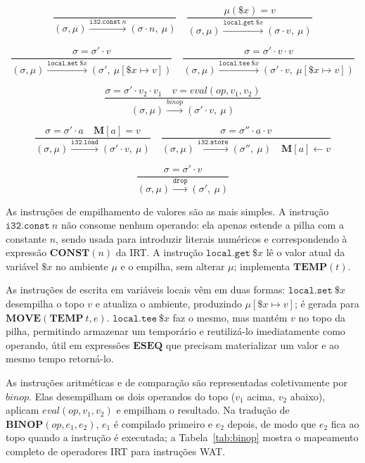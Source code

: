 \begin{Definition}\label{def:wat-instrs}
  \[
    \dfrac{}
    {(\sigma, \mu) \xrightarrow{\mathtt{i32.const}\ n} (\sigma \cdot n,\ \mu)}
    \quad
    \dfrac{\mu(\$x) = v}
    {(\sigma, \mu) \xrightarrow{\mathtt{local.get}\ \$x} (\sigma \cdot v,\ \mu)}
  \]

  \[
    \dfrac{\sigma = \sigma' \cdot v}
    {(\sigma, \mu) \xrightarrow{\mathtt{local.set}\ \$x}
    (\sigma',\ \mu[\$x \mapsto v])}
    \quad
    \dfrac{\sigma = \sigma' \cdot v \cdot v}
    {(\sigma, \mu) \xrightarrow{\mathtt{local.tee}\ \$x} (\sigma'
    \cdot v,\ \mu[\$x \mapsto v])}
  \]

  \[
    \dfrac{\sigma = \sigma' \cdot v_2 \cdot v_1 \quad v =
    \mathit{eval}(\mathit{op}, v_1, v_2)}
    {(\sigma, \mu) \xrightarrow{\mathit{binop}} (\sigma' \cdot v,\ \mu)}
  \]

  \[
    \dfrac{\sigma = \sigma' \cdot a \quad \mathbf{M}[a] = v}
    {(\sigma, \mu) \xrightarrow{\mathtt{i32.load}} (\sigma' \cdot v,\ \mu)}
    \quad
    \dfrac{\sigma = \sigma'' \cdot a \cdot v}
    {(\sigma, \mu) \xrightarrow{\mathtt{i32.store}} (\sigma'',\ \mu)
    \quad \mathbf{M}[a] \leftarrow v}
  \]

  \[
    \dfrac{\sigma = \sigma' \cdot v}
    {(\sigma, \mu) \xrightarrow{\mathtt{drop}} (\sigma',\ \mu)}
  \]
\end{Definition}

As instruções de empilhamento de valores são as mais simples.
A instrução $\mathtt{i32.const}\ n$ não consome nenhum operando: ela apenas
estende a pilha com a constante $n$, sendo usada para introduzir literais
numéricos e correspondendo à expressão $\mathbf{CONST}(n)$ da IRT\@.
A instrução $\mathtt{local.get}\ \$x$ lê o valor atual da variável $\$x$ no
ambiente $\mu$ e o empilha, sem alterar $\mu$; implementa
$\mathbf{TEMP}(t)$.

As instruções de escrita em variáveis locais vêm em duas formas:
$\mathtt{local.set}\ \$x$ desempilha o topo $v$ e atualiza o ambiente,
produzindo $\mu[\$x \mapsto v]$; é gerada para
$\mathbf{MOVE}(\mathbf{TEMP}\ t, e)$.
$\mathtt{local.tee}\ \$x$ faz o mesmo, mas mantém $v$ no topo da pilha,
permitindo armazenar um temporário e reutilizá-lo imediatamente como operando,
útil em expressões $\mathbf{ESEQ}$ que precisam materializar um valor e ao
mesmo tempo retorná-lo.

As instruções aritméticas e de comparação são representadas coletivamente por
$\mathit{binop}$. Elas desempilham os dois operandos do topo ($v_1$ acima,
$v_2$ abaixo), aplicam $\mathit{eval}(\mathit{op}, v_1, v_2)$ e empilham o
resultado. Na tradução de $\mathbf{BINOP}(\mathit{op}, e_1, e_2)$, $e_1$ é
compilado primeiro e $e_2$ depois, de modo que $e_2$ fica ao topo quando a
instrução é executada; a Tabela~\ref{tab:binop} mostra o mapeamento completo
de operadores IRT para instruções WAT.

